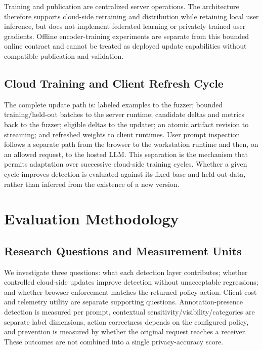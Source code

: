 \documentclass[conference]{IEEEtran}
\begin{document}
Training and publication are centralized server operations. The architecture therefore supports cloud-side retraining and distribution while retaining local user inference, but does not implement federated learning or privately trained user gradients. Offline encoder-training experiments are separate from this bounded online contract and cannot be treated as deployed update capabilities without compatible publication and validation.

\subsection{Cloud Training and Client Refresh Cycle}

The complete update path is: labeled examples to the fuzzer; bounded training/held-out batches to the server runtime; candidate deltas and metrics back to the fuzzer; eligible deltas to the updater; an atomic artifact revision to streaming; and refreshed weights to client runtimes. User prompt inspection follows a separate path from the browser to the workstation runtime and then, on an allowed request, to the hosted LLM. This separation is the mechanism that permits adaptation over successive cloud-side training cycles. Whether a given cycle improves detection is evaluated against its fixed base and held-out data, rather than inferred from the existence of a new version.

\section{Evaluation Methodology}
\label{sec:methodology}

\subsection{Research Questions and Measurement Units}

We investigate three questions: what each detection layer contributes; whether controlled cloud-side updates improve detection without unacceptable regressions; and whether browser enforcement matches the returned policy action. Client cost and telemetry utility are separate supporting questions. Annotation-presence detection is measured per prompt, contextual sensitivity/visibility/categories are separate label dimensions, action correctness depends on the configured policy, and prevention is measured by whether the original request reaches a receiver. These outcomes are not combined into a single privacy-accuracy score.
\end{document}
